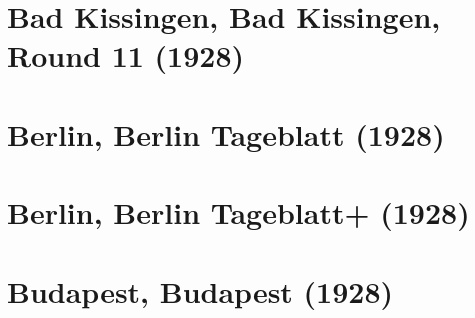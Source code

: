 \documentclass[11pt]{article}
\begin{document}
\clearpage

\section{Bad Kissingen, Bad Kissingen, Round 11 (1928)}


\clearpage

\section{Berlin, Berlin Tageblatt (1928)}


\clearpage



\clearpage



\clearpage



\clearpage



\clearpage



\clearpage



\clearpage



\clearpage



\clearpage



\clearpage



\clearpage



\clearpage

\section{Berlin, Berlin Tageblatt+ (1928)}


\clearpage

\section{Budapest, Budapest (1928)}


\clearpage
\end{document}
